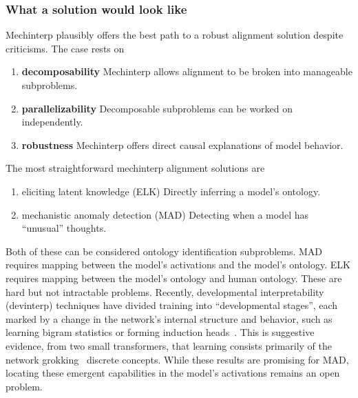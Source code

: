 \subsubsection{What a solution would look like}
Mechinterp plausibly offers the best path to a robust alignment
solution despite criticisms.
The case rests on
\begin{enumerate}
    \item \textbf{decomposability} Mechinterp allows alignment to be
    broken into manageable subproblems.
    \item \textbf{parallelizability} Decomposable subproblems can be
    worked on independently.
    \item \textbf{robustness} Mechinterp offers direct causal
    explanations of model behavior.
\end{enumerate}
The most straightforward mechinterp alignment solutions are
\begin{enumerate}
    \item eliciting latent knowledge (ELK)
    Directly inferring a model's ontology.
    \label{it:elk}
    \item mechanistic anomaly detection (MAD)
    Detecting when a model has ``unusual'' thoughts.
    \label{it:mad}
\end{enumerate}
Both of these can be considered
ontology identification subproblems. MAD requires mapping between the model's activations and
the model's ontology. ELK requires mapping between the model's ontology
and human ontology. These are hard but not intractable problems.
Recently, developmental interpretability
(devinterp) techniques have divided training into ``developmental
stages'', each marked by a change in the network's internal structure
and behavior, such as learning bigram statistics or forming induction
heads~\cite{hoogland2024developmental}. This is suggestive evidence,
from two small transformers, that learning consists primarily of the
network grokking~\cite{nanda2023progress} discrete concepts. While these results
are promising for MAD, locating these emergent capabilities in the
model's activations remains an open problem.

